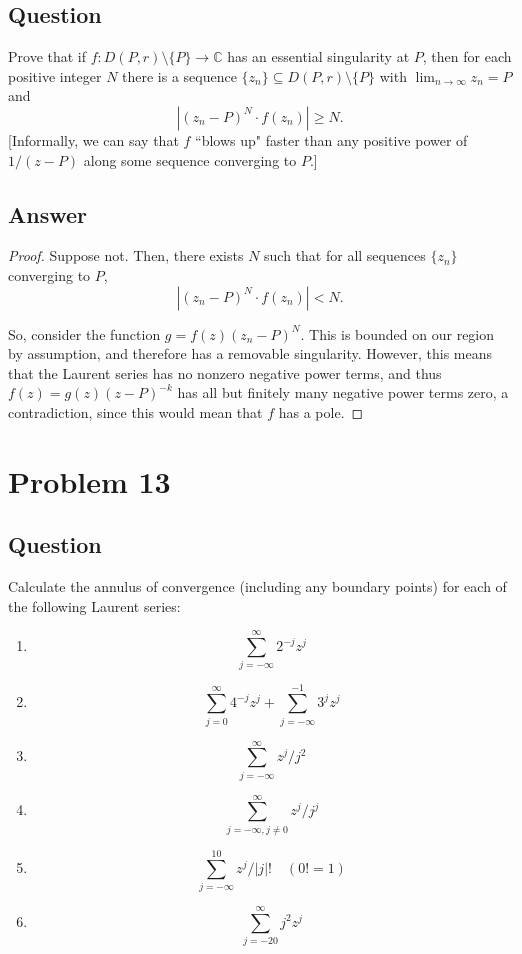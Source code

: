 \documentclass[11pt]{article}
\begin{document}
\subsection{Question}
Prove that if $f: D(P,r) \setminus \{P\} \to \mathbb{C}$ has an essential singularity at $P$, then for each positive integer $N$ there is a sequence $\{z_n\} \subseteq D(P,r) \setminus \{P\}$ with $\lim_{n \to \infty} z_n =P$ and
\[|(z_n-P)^N \cdot f(z_n)| \geq N.\]
[Informally, we can say that $f$ ``blows up" faster than any positive power of $1/(z-P)$ along some sequence converging to $P$.]
\subsection{Answer}
\begin{proof}
Suppose not. Then, there exists $N$ such that  for all sequences $\{z_n\}$ converging to $P$, 
\[|(z_n-P)^N \cdot f(z_n)| < N.\]

So, consider the function $g = f(z) (z_n - P)^N$. This is bounded on our region by assumption, and therefore has a removable singularity. However, this means that the Laurent series has no nonzero negative power terms, and thus $f(z) = g(z) (z-P)^{-k}$ has all but finitely many negative power terms zero, a contradiction, since this would mean that $f$ has a pole.
\end{proof}

\section{Problem 13}
\subsection{Question}
Calculate the annulus of convergence (including any boundary points) for each of the following Laurent series:
\begin{enumerate}
\item \[\sum_{j=-\infty}^ \infty  2^{-j} z^j\]
\item \[\sum_{j=0}^ \infty  4^{-j}z^j + \sum_{j = -\infty}^{-1} 3^j z^j  \]
\item \[\sum_{j=-\infty}^ \infty z^j  / j^2 \]
\item \[\sum_{j=-\infty, j \neq 0}^ \infty  z^j / j^j \]
\item \[\sum_{j=-\infty}^{10} z^j / |j|! \quad (0! =1)  \]
\item \[\sum_{j=-20}^ \infty j^2 z^j \]
\end{enumerate}
\end{document}
